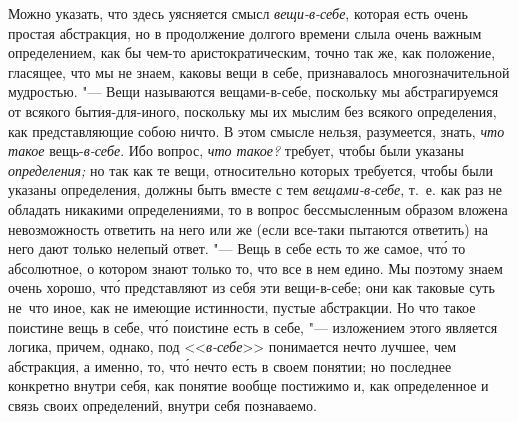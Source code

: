 Можно указать, что здесь уясняется смысл
{\em вещи-в-себе}, которая есть очень простая
абстракция, но в продолжение долгого времени слыла очень важным
определением, как бы чем-то аристократическим, точно так же, как положение,
гласящее, что мы не знаем, каковы вещи в себе, признавалось
многозначительной мудростью. "--- Вещи называются вещами-в-себе, поскольку мы
абстрагируемся от всякого бытия-для-иного, поскольку мы их мыслим без
всякого определения, как представляющие собою ничто. В этом смысле нельзя,
разумеется, знать, {\em что такое}
вещь-{\em в-себе}. Ибо вопрос,
{\em что такое?} требует, чтобы были указаны
{\em определения;} но так как те вещи, относительно
которых требуется, чтобы были указаны определения, должны быть вместе с тем
{\em вещами-в-себе}, т.~е. как раз не обладать никакими
определениями, то в вопрос бессмысленным образом вложена невозможность
ответить на него или же (если все-таки пытаются ответить) на него дают только
нелепый ответ. "--- Вещь в себе есть то же самое, чт\'{о} то абсолютное,
о котором знают только то, что все в нем едино. Мы поэтому знаем очень
хорошо, чт\'{о} представляют из себя эти вещи-в-себе; они как таковые суть
не~что иное, как не имеющие истинности, пустые абстракции. Но что такое
поистине вещь в себе, чт\'{о} поистине есть в себе, "--- изложением этого
является логика, причем, однако, под <<{\em в-себе}>> понимается нечто
лучшее, чем абстракция, а именно, то, чт\'{о} нечто есть в своем понятии;
но последнее конкретно внутри себя, как понятие вообще постижимо и, как
определенное и связь своих определений, внутри себя познаваемо.

